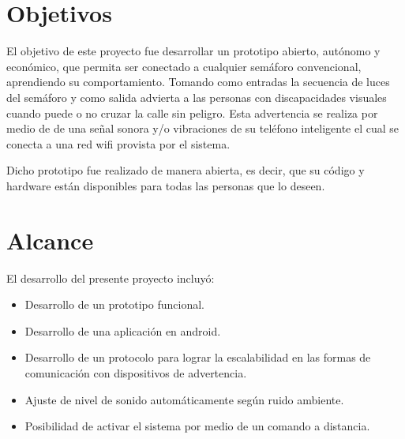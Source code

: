 \section{Objetivos}

El objetivo de este proyecto fue desarrollar un prototipo abierto, autónomo y económico, que permita ser conectado a cualquier semáforo convencional, aprendiendo su comportamiento. Tomando como entradas la secuencia de luces del semáforo y como salida advierta a las personas con discapacidades visuales
cuando puede o no cruzar la calle sin peligro. Esta advertencia se realiza por medio de de una señal sonora y/o vibraciones de su teléfono inteligente el cual se conecta a una red wifi \citep{raeWifi} provista por el sistema.

Dicho prototipo fue realizado de manera abierta, es decir, que su código y hardware están disponibles para todas las personas que lo  deseen.


\section{Alcance}

El desarrollo del presente proyecto incluyó:
\begin{itemize}
\item Desarrollo de un prototipo funcional.
\item Desarrollo de una aplicación en android.
\item Desarrollo de un protocolo para lograr la escalabilidad en las formas de comunicación con dispositivos de advertencia.
\item Ajuste de nivel de sonido automáticamente según ruido ambiente.
\item Posibilidad de activar el sistema por medio de un comando a distancia.
\end{itemize}







